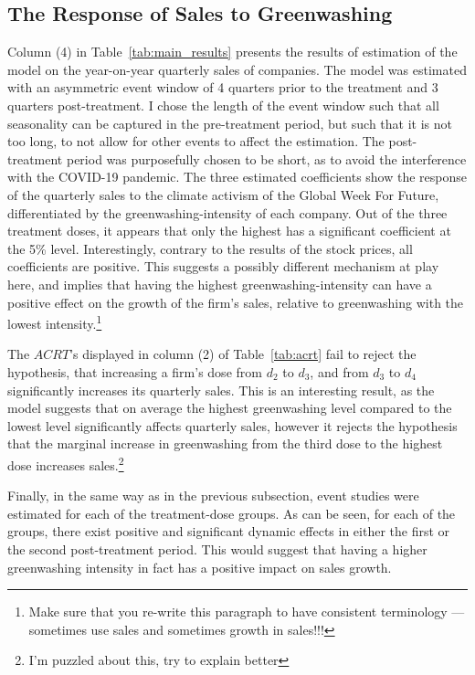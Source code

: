 \documentclass[12pt]{article}
\begin{document}


\subsection{The Response of Sales to Greenwashing}

Column (4) in Table~\ref{tab:main_results} presents the results of estimation of the model on the year-on-year quarterly sales of companies. The model was estimated with an asymmetric event window of 4 quarters prior to the treatment and 3 quarters post-treatment. I chose the length of the event window such that all seasonality can be captured in the pre-treatment period, but such that it is not too long, to not allow for other events to affect the estimation. The post-treatment period was purposefully chosen to be short, as to avoid the interference with the COVID-19 pandemic. The three estimated coefficients show the response of the quarterly sales to the climate activism of the Global Week For Future, differentiated by the greenwashing-intensity of each company. Out of the three treatment doses, it appears that only the highest has a significant coefficient at the 5\% level. Interestingly, contrary to the results of the stock prices, all coefficients are positive. This suggests a possibly different mechanism at play here, and implies that having the highest greenwashing-intensity can have a positive effect on the growth of the firm's sales, relative to greenwashing with the lowest intensity.\footnote{Make sure that you re-write this paragraph to have consistent terminology --- sometimes use sales and sometimes growth in sales!!! }

The $ACRT$'s displayed in column (2) of Table~\ref{tab:acrt} fail to reject the hypothesis, that increasing a firm's dose from $d_2$ to $d_3$, and from $d_3$ to $d_4$ significantly increases its quarterly sales. This is an interesting result, as the model suggests that on average the highest greenwashing level compared to the lowest level significantly affects quarterly sales, however it rejects the hypothesis that the marginal increase in greenwashing from the third dose to the highest dose increases sales.\footnote{I'm puzzled about this, try to explain better}

Finally, in the same way as in the previous subsection, event studies were estimated for each of the treatment-dose groups. As can be seen, for each of the groups, there exist positive and significant dynamic effects in either the first or the second post-treatment period. This would suggest that having a higher greenwashing intensity in fact has a positive impact on sales growth.
\end{document}
